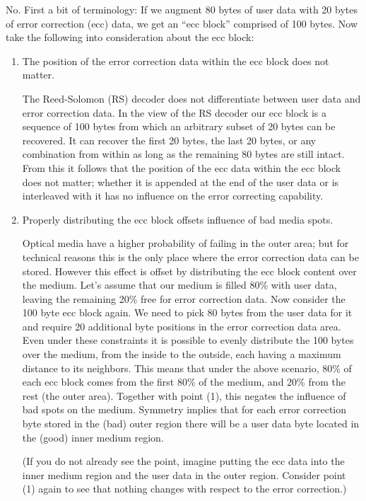     {\label{qa-ecc-distribution}No. First a bit of terminology: If we augment 80 bytes of user data with 20 bytes
      of error correction (ecc) data, we get an ``ecc block'' comprised of 100 bytes.
      Now take the following into consideration about the ecc block:

      \begin{enumerate}
        \item The position of the error correction data within the ecc block does not matter.

          The Reed-Solomon (RS) decoder does not differentiate between user data and error
          correction data. In the view of the RS decoder our ecc block is a sequence of
          100 bytes from which an arbitrary subset of 20 bytes can be recovered. It can
          recover the first 20 bytes, the last 20 bytes, or any combination from within
          as long as the remaining 80 bytes are still intact. From this it follows that
          the position of the ecc data within the ecc block does not matter; whether it
          is appended at the end of the user data or is interleaved with it has no
          influence on the error correcting capability.

        \item Properly distributing the ecc block offsets influence of bad media spots.

          Optical media have a higher probability of failing in the outer area; but for
          technical reasons this is the only place where the error correction data
          can be stored. However this effect is offset by distributing the ecc block
          content over the medium. Let's assume that our medium is filled 80\% with
          user data, leaving the remaining 20\% free for error correction data.
          Now consider the 100 byte ecc block again. We need to pick 80 bytes from
          the user data for it and require 20 additional byte positions in the error
          correction data area. Even under these constraints it is possible to evenly
          distribute the 100 bytes over the medium, from the inside to the outside,
          each having a maximum distance to its neighbors. This means that under the
          above scenario, 80\% of each ecc block comes from the first 80\% of the medium,
          and 20\% from the rest (the outer area). Together with point (1), this negates
          the influence of bad spots on the medium. Symmetry implies that for each error
          correction byte stored in the (bad) outer region there will be a user data
          byte located in the (good) inner medium region.

          \smallskip
          
          (If you do not already see the point, imagine putting the ecc data into the
          inner medium region and the user data in the outer region. Consider point (1)
          again to see that nothing changes with respect to the error correction.)
      \end{enumerate}}

